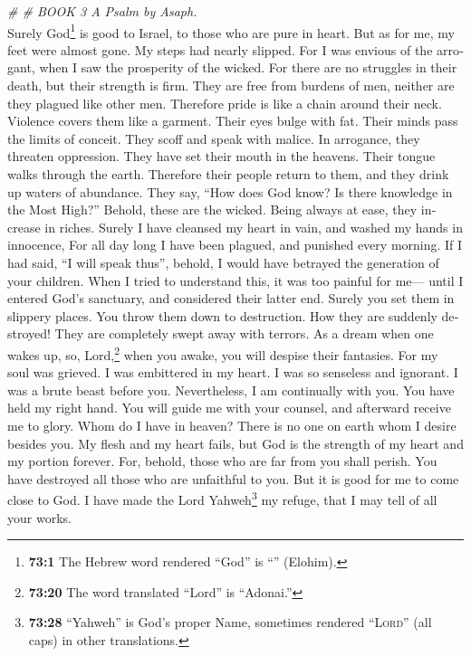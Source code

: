 \begin{paracol}{2}
\begin{otherlanguage}{english}
\emph{\# \# BOOK 3 A Psalm by Asaph.}\\
 Surely God\footnote{\textbf{73:1} The Hebrew word
  rendered ``God'' is ``'' (Elohim).} is good to Israel,
to those who are pure in heart.  But as for me, my feet
were almost gone. My steps had nearly slipped.  For I was
envious of the arrogant, when I saw the prosperity of the wicked.
 For there are no struggles in their death, but their
strength is firm.  They are free from burdens of men,
neither are they plagued like other men.  Therefore pride
is like a chain around their neck. Violence covers them like a garment.
 Their eyes bulge with fat. Their minds pass the limits of
conceit.  They scoff and speak with malice. In arrogance,
they threaten oppression.  They have set their mouth in
the heavens. Their tongue walks through the earth. 
Therefore their people return to them, and they drink up waters of
abundance.  They say, ``How does God know? Is there
knowledge in the Most High?''  Behold, these are the
wicked. Being always at ease, they increase in riches. 
Surely I have cleansed my heart in vain, and washed my hands in
innocence,  For all day long I have been plagued, and
punished every morning.  If I had said, ``I will speak
thus'', behold, I would have betrayed the generation of your children.
 When I tried to understand this, it was too painful for
me---  until I entered God's sanctuary, and considered
their latter end.  Surely you set them in slippery
places. You throw them down to destruction.  How they are
suddenly destroyed! They are completely swept away with terrors.
 As a dream when one wakes up, so, Lord,\footnote{\textbf{73:20}
  The word translated ``Lord'' is ``Adonai.''} when you awake, you will
despise their fantasies.  For my soul was grieved. I was
embittered in my heart.  I was so senseless and ignorant.
I was a brute beast before you.  Nevertheless, I am
continually with you. You have held my right hand.  You
will guide me with your counsel, and afterward receive me to glory.
 Whom do I have in heaven? There is no one on earth whom
I desire besides you.  My flesh and my heart fails, but
God is the strength of my heart and my portion forever. 
For, behold, those who are far from you shall perish. You have destroyed
all those who are unfaithful to you.  But it is good for
me to come close to God. I have made the Lord Yahweh\footnote{\textbf{73:28}
  ``Yahweh'' is God's proper Name, sometimes rendered ``\textsc{Lord}''
  (all caps) in other translations.} my refuge, that I may tell of all
your works.


\end{otherlanguage}
\end{paracol}
